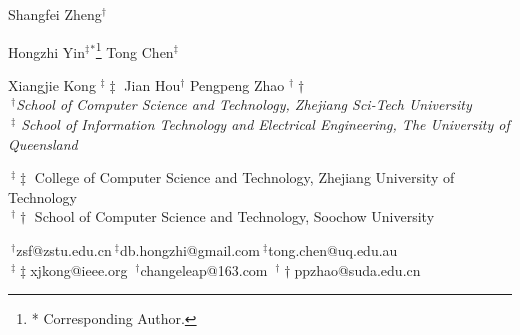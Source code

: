 \documentclass[conference]{IEEEtran}
\begin{document}
{
	Shangfei Zheng{\small$^\dag$}\hspace*{10pt}
  	
	Hongzhi Yin{\small$^\ddag$}{$^*$}\hspace*{10pt}\thanks{* Corresponding Author.}
	Tong Chen{\small$^\ddag$}\hspace*{10pt}
 
 Xiangjie Kong {\small$^\ddag\ddag$} \hspace*{10pt}
	Jian Hou{\small$^\dag $}\hspace*{10pt}\hspace*{10pt}   Pengpeng Zhao {\small$^\dag\dag$} \hspace*{10pt}\\
	\fontsize{10}{10}\selectfont\itshape $~^\dag$School of Computer Science and Technology, Zhejiang Sci-Tech University\\

	\fontsize{10}{10}\selectfont\itshape
	$~^\ddag$ School of Information Technology and Electrical Engineering, The University of Queensland\\
 \fontsize{10}{10}\selectfont\itshape

 $~^\ddag\ddag$ College of Computer Science and Technology, Zhejiang University of Technology\\

	$~^\dag\dag$ School of Computer Science and Technology, Soochow University\\
		\fontsize{10}{10}\selectfont\itshape

	\fontsize{9}{9}\selectfont\ttfamily\upshape$~^\dag$zsf@zstu.edu.cn\hspace*{10pt}$~^\ddag$db.hongzhi@gmail.com\hspace*{10pt}$~^\ddag$tong.chen@uq.edu.au\\ 
 \hspace*{10pt}$~^\ddag\ddag$xjkong@ieee.org
 \hspace*{10pt}
$~^\dag$changeleap@163.com \hspace*{10pt}$~^\dag\dag$ppzhao@suda.edu.cn\\
}
\maketitle
\end{document}
